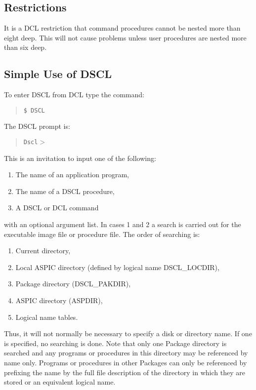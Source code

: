 \subsection {Restrictions}
It is a DCL restriction that command procedures cannot be nested more than
eight deep.
This will not cause problems unless user procedures are nested more than six
deep.
\subsection {Simple Use of DSCL}
To enter DSCL from DCL type the command:
\begin{quote}
{\tt \$ DSCL}
\end{quote}
The DSCL prompt is:
\begin{quote}
{\tt Dscl$>$}
\end{quote}
This is an invitation to input one of the following:
\begin{enumerate}
\item The name of an application program,
\item The name of a DSCL procedure,
\item A DSCL or DCL command
\end{enumerate}
with an optional argument list.
In cases 1 and 2 a search is carried out for the executable image file or
procedure file.
The order of searching is:
\begin{enumerate}
\item Current directory,
\item Local ASPIC directory (defined by logical name DSCL\_LOCDIR),
\item Package directory (DSCL\_PAKDIR),
\item ASPIC directory (ASPDIR),
\item Logical name tables.
\end{enumerate}
Thus, it will not normally be necessary to specify a disk or directory name.
If one is specified, no searching is done.
Note that only one Package directory is searched and any
programs or procedures in this directory may be referenced by name only.
Programs or procedures in other Packages can only be referenced by prefixing the
name by the full file description of the directory in which they are stored or
an equivalent logical name.

